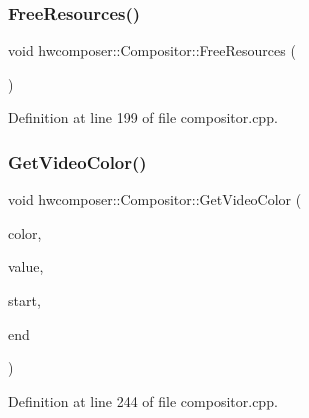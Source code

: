 \subsubsection{\texorpdfstring{Free\+Resources()}{FreeResources()}}
{\footnotesize\ttfamily void hwcomposer\+::\+Compositor\+::\+Free\+Resources (\begin{DoxyParamCaption}{ }\end{DoxyParamCaption})}



Definition at line 199 of file compositor.\+cpp.


\begin{DoxyCode}{0}
\end{DoxyCode}
\mbox{\label{classhwcomposer_1_1Compositor_a736674112ad74dfb5b6f84a4521623d6}} 
\subsubsection{\texorpdfstring{Get\+Video\+Color()}{GetVideoColor()}}
{\footnotesize\ttfamily void hwcomposer\+::\+Compositor\+::\+Get\+Video\+Color (\begin{DoxyParamCaption}\item[{H\+W\+C\+Color\+Control}]{color,  }\item[{float $\ast$}]{value,  }\item[{float $\ast$}]{start,  }\item[{float $\ast$}]{end }\end{DoxyParamCaption})}



Definition at line 244 of file compositor.\+cpp.


\begin{DoxyCode}{0}
\end{DoxyCode}
\mbox{\label{classhwcomposer_1_1Compositor_a5ad90c739aabb16ec737b9b6f8ceb991}} 
